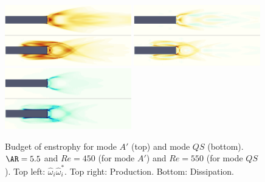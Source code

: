 \begin{figure}
  \centering
  \includegraphics[width=0.49\textwidth]{./fig/AR5s/Enst_AR5p5_Re450_Re550_beta2.png}
  \includegraphics[width=0.49\textwidth]{./fig/AR5s/ProdEnst_AR5p5_Re450_Re550_beta2.png}
  \includegraphics[width=0.49\textwidth]{./fig/AR5s/DissEnst_AR5p5_Re450_Re550_beta2.png}    
  \caption{Budget of enstrophy for mode $A'$ (top) and mode $QS$ (bottom). $\AR=5.5$ and $Re=450$ (for mode $A'$) and $Re=550$ (for mode $QS$). Top left: $\hat{\omega}_i \hat{\omega}_i^*$. Top right: Production. Bottom: Dissipation.}
  \label{fig:budget_enst}
\end{figure}  
